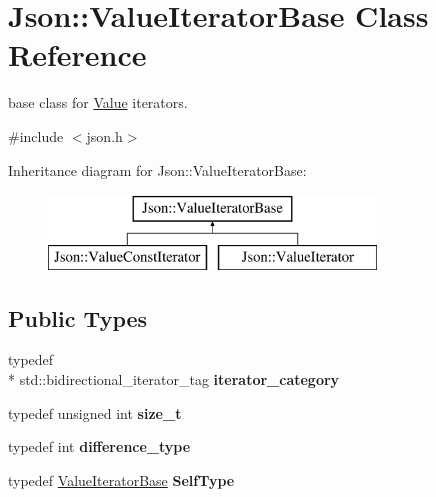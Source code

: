 \hypertarget{class_json_1_1_value_iterator_base}{\section{Json\-:\-:Value\-Iterator\-Base Class Reference}
\label{class_json_1_1_value_iterator_base}
}


base class for \hyperlink{class_json_1_1_value}{Value} iterators.  




{\ttfamily \#include $<$json.\-h$>$}

Inheritance diagram for Json\-:\-:Value\-Iterator\-Base\-:\begin{figure}[H]
\begin{center}
\leavevmode
\includegraphics[height=2.000000cm]{class_json_1_1_value_iterator_base}
\end{center}
\end{figure}
\subsection*{Public Types}
\begin{DoxyCompactItemize}
\item 
\hypertarget{class_json_1_1_value_iterator_base_a02fd11a4fbdc0007da1e8bcf5e6b83c3}{typedef \\*
std\-::bidirectional\-\_\-iterator\-\_\-tag {\bfseries iterator\-\_\-category}}\label{class_json_1_1_value_iterator_base_a02fd11a4fbdc0007da1e8bcf5e6b83c3}

\item 
\hypertarget{class_json_1_1_value_iterator_base_a9d3a3c7ce5cdefe23cb486239cf07bb5}{typedef unsigned int {\bfseries size\-\_\-t}}\label{class_json_1_1_value_iterator_base_a9d3a3c7ce5cdefe23cb486239cf07bb5}

\item 
\hypertarget{class_json_1_1_value_iterator_base_a4e44bf8cbd17ec8d6e2c185904a15ebd}{typedef int {\bfseries difference\-\_\-type}}\label{class_json_1_1_value_iterator_base_a4e44bf8cbd17ec8d6e2c185904a15ebd}

\item 
\hypertarget{class_json_1_1_value_iterator_base_a9d2a940d03ea06d20d972f41a89149ee}{typedef \hyperlink{class_json_1_1_value_iterator_base}{Value\-Iterator\-Base} {\bfseries Self\-Type}}\label{class_json_1_1_value_iterator_base_a9d2a940d03ea06d20d972f41a89149ee}

\end{DoxyCompactItemize}
